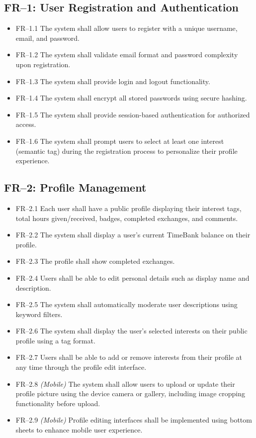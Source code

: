 \documentclass[11pt,a4paper]{report}
\begin{document}
\subsection{FR--1: User Registration and Authentication}
\begin{itemize}
    \item FR--1.1 The system shall allow users to register with a unique username, email, and password.
    \item FR--1.2 The system shall validate email format and password complexity upon registration.
    \item FR--1.3 The system shall provide login and logout functionality.
    \item FR--1.4 The system shall encrypt all stored passwords using secure hashing.
    \item FR--1.5 The system shall provide session-based authentication for authorized access.
    \item FR--1.6 The system shall prompt users to select at least one interest (semantic tag) during the registration process to personalize their profile experience.
\end{itemize}

\subsection{FR--2: Profile Management}
\begin{itemize}
    \item FR--2.1 Each user shall have a public profile displaying their interest tags, total hours given/received, badges, completed exchanges, and comments.
    \item FR--2.2 The system shall display a user's current TimeBank balance on their profile.
    \item FR--2.3 The profile shall show completed exchanges.
    \item FR--2.4 Users shall be able to edit personal details such as display name and description.
    \item FR--2.5 The system shall automatically moderate user descriptions using keyword filters.
    \item FR--2.6 The system shall display the user's selected interests on their public profile using a tag format.
    \item FR--2.7 Users shall be able to add or remove interests from their profile at any time through the profile edit interface.
    \item FR--2.8 \textit{(Mobile)} The system shall allow users to upload or update their profile picture using the device camera or gallery, including image cropping functionality before upload.
    \item FR--2.9 \textit{(Mobile)} Profile editing interfaces shall be implemented using bottom sheets to enhance mobile user experience.
\end{itemize}
\end{document}
